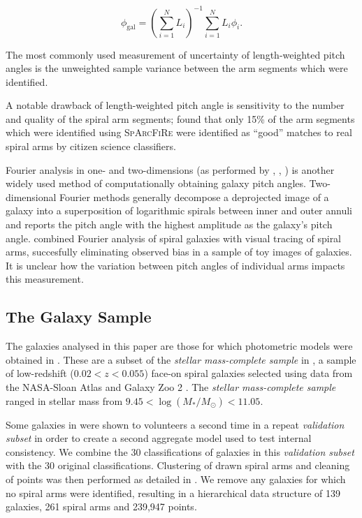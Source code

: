 \begin{equation}
  \phi_\mathrm{gal} = \left(\sum_{i=1}^{N}L_i\right)^{-1}\sum_{i=1}^{N}L_i \phi_i.
\end{equation}

The most commonly used measurement of uncertainty of length-weighted pitch angles is the unweighted sample variance between the arm segments which were identified.

A notable drawback of length-weighted pitch angle is sensitivity to the number and quality of the spiral arm segments; \citet{2017MNRAS.472.2263H} found that only 15\% of the arm segments which were identified using \textsc{SpArcFiRe} \citep{2014ApJ...790...87D} were identified as ``good'' matches to real spiral arms by citizen science classifiers.

Fourier analysis in one- and two-dimensions (as performed by \citealt{2019arXiv190804246D}, \citealt{2012ApJS..199...33D}, \citealt{2018MNRAS.474.2594M}) is another widely used method of computationally obtaining galaxy pitch angles. Two-dimensional Fourier methods generally decompose a deprojected image of a galaxy into a superposition of logarithmic spirals between inner and outer annuli \citep{2012ApJS..199...33D} and reports the pitch angle with the highest amplitude as the galaxy's pitch angle. \citet{2020MNRAS.493.3854H} combined Fourier analysis of spiral galaxies with visual tracing of spiral arms, succesfully eliminating observed bias in a sample of toy images of galaxies. It is unclear how the variation between pitch angles of individual arms impacts this measurement.

\subsection{The Galaxy Sample}
The galaxies analysed in this paper are those for which photometric models were obtained in \citet{2020arXiv200610450L}. These are a subset of the \textit{stellar mass-complete sample} in \citet{2017MNRAS.472.2263H}, a sample of low-redshift ($0.02 < z < 0.055$) face-on spiral galaxies selected using data from the NASA-Sloan Atlas \citep{2011AJ....142...31B} and Galaxy Zoo 2 \citep{Willett2013:1308.3496v2}. The \textit{stellar mass-complete sample} ranged in stellar mass from $9.45 < \log(M_* / M_\odot) < 11.05$.

Some galaxies in \citet{2020arXiv200610450L} were shown to volunteers a second time in a repeat \textit{validation subset} in order to create a second aggregate model used to test internal consistency. We combine the 30 classifications of galaxies in this \textit{validation subset} with the 30 original classifications. Clustering of drawn spiral arms and cleaning of points was then performed as detailed in \citet{2020arXiv200610450L}. We remove any galaxies for which no spiral arms were identified, resulting in a hierarchical data structure of 139 galaxies, 261 spiral arms and 239,947 points.

